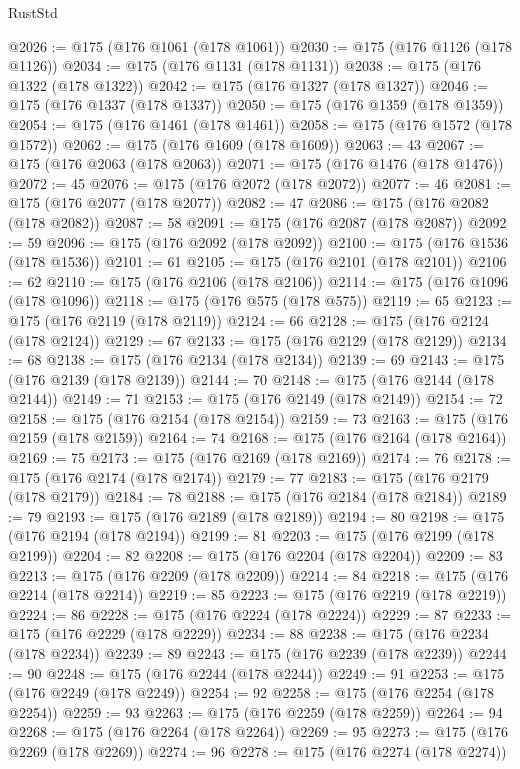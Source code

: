 \begin{lexlean}{RustStd}
\begin{coremodule}
@2026 := @175 (@176 @1061 (@178 @1061))
@2030 := @175 (@176 @1126 (@178 @1126))
@2034 := @175 (@176 @1131 (@178 @1131))
@2038 := @175 (@176 @1322 (@178 @1322))
@2042 := @175 (@176 @1327 (@178 @1327))
@2046 := @175 (@176 @1337 (@178 @1337))
@2050 := @175 (@176 @1359 (@178 @1359))
@2054 := @175 (@176 @1461 (@178 @1461))
@2058 := @175 (@176 @1572 (@178 @1572))
@2062 := @175 (@176 @1609 (@178 @1609))
@2063 := 43
@2067 := @175 (@176 @2063 (@178 @2063))
@2071 := @175 (@176 @1476 (@178 @1476))
@2072 := 45
@2076 := @175 (@176 @2072 (@178 @2072))
@2077 := 46
@2081 := @175 (@176 @2077 (@178 @2077))
@2082 := 47
@2086 := @175 (@176 @2082 (@178 @2082))
@2087 := 58
@2091 := @175 (@176 @2087 (@178 @2087))
@2092 := 59
@2096 := @175 (@176 @2092 (@178 @2092))
@2100 := @175 (@176 @1536 (@178 @1536))
@2101 := 61
@2105 := @175 (@176 @2101 (@178 @2101))
@2106 := 62
@2110 := @175 (@176 @2106 (@178 @2106))
@2114 := @175 (@176 @1096 (@178 @1096))
@2118 := @175 (@176 @575 (@178 @575))
@2119 := 65
@2123 := @175 (@176 @2119 (@178 @2119))
@2124 := 66
@2128 := @175 (@176 @2124 (@178 @2124))
@2129 := 67
@2133 := @175 (@176 @2129 (@178 @2129))
@2134 := 68
@2138 := @175 (@176 @2134 (@178 @2134))
@2139 := 69
@2143 := @175 (@176 @2139 (@178 @2139))
@2144 := 70
@2148 := @175 (@176 @2144 (@178 @2144))
@2149 := 71
@2153 := @175 (@176 @2149 (@178 @2149))
@2154 := 72
@2158 := @175 (@176 @2154 (@178 @2154))
@2159 := 73
@2163 := @175 (@176 @2159 (@178 @2159))
@2164 := 74
@2168 := @175 (@176 @2164 (@178 @2164))
@2169 := 75
@2173 := @175 (@176 @2169 (@178 @2169))
@2174 := 76
@2178 := @175 (@176 @2174 (@178 @2174))
@2179 := 77
@2183 := @175 (@176 @2179 (@178 @2179))
@2184 := 78
@2188 := @175 (@176 @2184 (@178 @2184))
@2189 := 79
@2193 := @175 (@176 @2189 (@178 @2189))
@2194 := 80
@2198 := @175 (@176 @2194 (@178 @2194))
@2199 := 81
@2203 := @175 (@176 @2199 (@178 @2199))
@2204 := 82
@2208 := @175 (@176 @2204 (@178 @2204))
@2209 := 83
@2213 := @175 (@176 @2209 (@178 @2209))
@2214 := 84
@2218 := @175 (@176 @2214 (@178 @2214))
@2219 := 85
@2223 := @175 (@176 @2219 (@178 @2219))
@2224 := 86
@2228 := @175 (@176 @2224 (@178 @2224))
@2229 := 87
@2233 := @175 (@176 @2229 (@178 @2229))
@2234 := 88
@2238 := @175 (@176 @2234 (@178 @2234))
@2239 := 89
@2243 := @175 (@176 @2239 (@178 @2239))
@2244 := 90
@2248 := @175 (@176 @2244 (@178 @2244))
@2249 := 91
@2253 := @175 (@176 @2249 (@178 @2249))
@2254 := 92
@2258 := @175 (@176 @2254 (@178 @2254))
@2259 := 93
@2263 := @175 (@176 @2259 (@178 @2259))
@2264 := 94
@2268 := @175 (@176 @2264 (@178 @2264))
@2269 := 95
@2273 := @175 (@176 @2269 (@178 @2269))
@2274 := 96
@2278 := @175 (@176 @2274 (@178 @2274))

\end{coremodule}
\end{lexlean}
